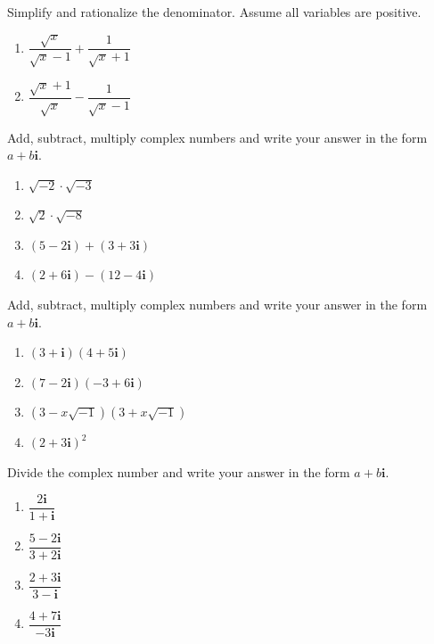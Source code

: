 \documentclass[en,12pt]{elegantbook}
\providecommand{\tightlist}{%
  \setlength{\itemsep}{0pt}\setlength{\parskip}{0pt}}
\newcommand{\ii}{\mathbf{i}}
\let\BeginKnitrBlock\begin \let\EndKnitrBlock\end
\begin{document}
\BeginKnitrBlock{exercise}
\protect\hypertarget{exr:unnamed-chunk-117}{}{\label{exr:unnamed-chunk-117} }
Simplify and rationalize the denominator. Assume all variables are positive.

\begin{enumerate}
\def\labelenumi{\arabic{enumi}.}
\tightlist
\item
  \(\dfrac{\sqrt{x}}{\sqrt x-1}+\dfrac{1}{\sqrt{x}+1}\)
\item
  \(\dfrac{\sqrt{x}+1}{\sqrt x}-\dfrac{1}{\sqrt{x}-1}\)
\end{enumerate}
\EndKnitrBlock{exercise}

\BeginKnitrBlock{exercise}
\protect\hypertarget{exr:unnamed-chunk-118}{}{\label{exr:unnamed-chunk-118} }
Add, subtract, multiply complex numbers and write your answer in the form \(a+b\ii\).

\begin{enumerate}
\def\labelenumi{\arabic{enumi}.}
\tightlist
\item
  \(\sqrt{-2}\cdot\sqrt{-3}\)
\item
  \(\sqrt{2}\cdot\sqrt{-8}\)
\item
  \((5-2\ii)+(3+3\ii)\)
\item
  \((2+6\ii)-(12-4\ii)\)
\end{enumerate}
\EndKnitrBlock{exercise}

\BeginKnitrBlock{exercise}
\protect\hypertarget{exr:unnamed-chunk-119}{}{\label{exr:unnamed-chunk-119} }
Add, subtract, multiply complex numbers and write your answer in the form \(a+b\ii\).

\begin{enumerate}
\def\labelenumi{\arabic{enumi}.}
\tightlist
\item
  \((3+\ii)(4+5\ii)\)
\item
  \((7-2\ii)(-3+6\ii)\)
\item
  \((3-x\sqrt{-1})(3+x\sqrt{-1})\)
\item
  \((2+3\ii)^2\)
\end{enumerate}
\EndKnitrBlock{exercise}

\BeginKnitrBlock{exercise}
\protect\hypertarget{exr:unnamed-chunk-120}{}{\label{exr:unnamed-chunk-120} }
Divide the complex number and write your answer in the form \(a+b\ii\).

\begin{enumerate}
\def\labelenumi{\arabic{enumi}.}
\tightlist
\item
  \(\dfrac{2\ii}{1+\ii}\)
\item
  \(\dfrac{5-2\ii}{3+2\ii}\)
\item
  \(\dfrac{2+3\ii}{3-\ii}\)
\item
  \(\dfrac{4+7\ii}{-3\ii}\)
\end{enumerate}
\EndKnitrBlock{exercise}
\end{document}
